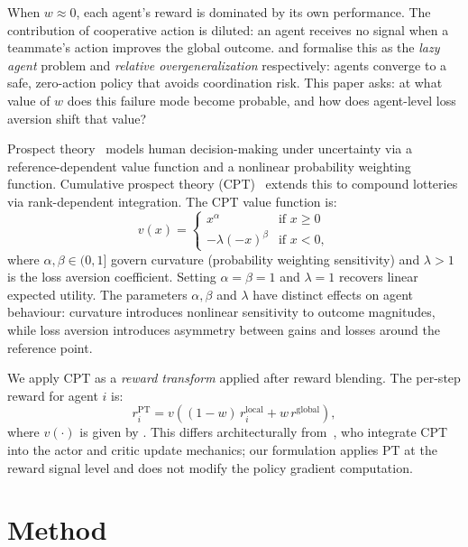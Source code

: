 \documentclass[letterpaper]{article}
\theoremstyle{plain}
\newcommand{\PT}{\mathrm{PT}}
\begin{document}
When $w \approx 0$, each agent's reward is dominated by its own
performance.
The contribution of cooperative action is diluted: an agent receives no
signal when a teammate's action improves the global outcome.
\citet{liu2023lazy} and \citet{peng2023curo} formalise this as the
\emph{lazy agent} problem and \emph{relative overgeneralization}
respectively: agents converge to a safe, zero-action policy that avoids
coordination risk.
This paper asks: at what value of $w$ does this failure mode become
probable, and how does agent-level loss aversion shift that value?

Prospect theory~\citep{kahneman1979} models human decision-making under
uncertainty via a reference-dependent value function and a nonlinear
probability weighting function.
Cumulative prospect theory (CPT)~\citep{tversky1992} extends this to
compound lotteries via rank-dependent integration.
The CPT value function is:
\begin{equation}
  v(x) =
  \begin{cases}
    x^{\alpha} & \text{if } x \geq 0 \\
    -\lambda(-x)^{\beta} & \text{if } x < 0,
  \end{cases}
  \label{eq:cpt}
\end{equation}
where $\alpha, \beta \in (0,1]$ govern curvature (probability weighting
sensitivity) and $\lambda > 1$ is the loss aversion coefficient.
Setting $\alpha{=}\beta{=}1$ and $\lambda{=}1$ recovers linear expected
utility.
The parameters $\alpha, \beta$ and $\lambda$ have distinct effects on
agent behaviour: curvature introduces nonlinear sensitivity to outcome
magnitudes, while loss aversion introduces asymmetry between gains and
losses around the reference point.

We apply CPT as a \emph{reward transform} applied after reward blending.
The per-step reward for agent $i$ is:
\begin{equation}
  r_i^{\PT} = v\!\left((1-w)\,r_i^{\mathrm{local}} + w\,r^{\mathrm{global}}\right),
  \label{eq:reward}
\end{equation}
where $v(\cdot)$ is given by .
This differs architecturally from~\citet{lalmohammed2025}, who integrate
CPT into the actor and critic update mechanics; our formulation applies PT
at the reward signal level and does not modify the policy gradient
computation.

\section{Method}
\label{sec:method}
\end{document}

